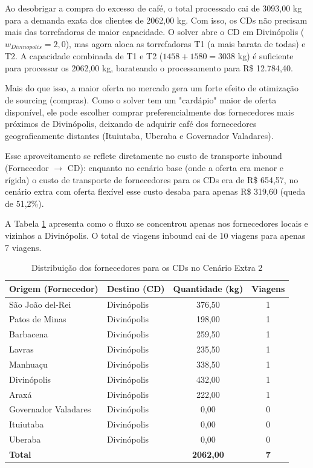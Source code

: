 \documentclass[a4paper,11pt]{article}
\begin{document}
Ao desobrigar a compra do excesso de café, o total processado cai de 3093,00 kg para a demanda exata dos clientes de 2062,00 kg. Com isso, os CDs não precisam mais das torrefadoras de maior capacidade. O solver abre o CD em Divinópolis ($w_{Divinopolis} = 2,0$), mas agora aloca as torrefadoras T1 (a mais barata de todas) e T2. A capacidade combinada de T1 e T2 ($1458 + 1580 = 3038$ kg) é suficiente para processar os 2062,00 kg, barateando o processamento para R\$ 12.784,40.

Mais do que isso, a maior oferta no mercado gera um forte efeito de otimização de sourcing (compras). Como o solver tem um "cardápio" maior de oferta disponível, ele pode escolher comprar preferencialmente dos fornecedores mais próximos de Divinópolis, deixando de adquirir café dos fornecedores geograficamente distantes (Ituiutaba, Uberaba e Governador Valadares).

Esse aproveitamento se reflete diretamente no custo de transporte inbound (Fornecedor $\rightarrow$ CD): enquanto no cenário base (onde a oferta era menor e rígida) o custo de transporte de fornecedores para os CDs era de R\$ 654,57, no cenário extra com oferta flexível esse custo desaba para apenas R\$ 319,60 (queda de 51,2\%).

A Tabela \ref{tab:cenario2_extra_forn_cd} apresenta como o fluxo se concentrou apenas nos fornecedores locais e vizinhos a Divinópolis. O total de viagens inbound cai de 10 viagens para apenas 7 viagens.

\begin{table}[H]
\centering
\begin{tabular}{llcc}
\hline
\textbf{Origem (Fornecedor)} & \textbf{Destino (CD)} & \textbf{Quantidade (kg)} & \textbf{Viagens} \\ \hline
São João del-Rei & Divinópolis & 376,50 & 1 \\
Patos de Minas & Divinópolis & 198,00 & 1 \\
Barbacena & Divinópolis & 259,50 & 1 \\
Lavras & Divinópolis & 235,50 & 1 \\
Manhuaçu & Divinópolis & 338,50 & 1 \\
Divinópolis & Divinópolis & 432,00 & 1 \\
Araxá & Divinópolis & 222,00 & 1 \\
Governador Valadares & Divinópolis & 0,00 & 0 \\
Ituiutaba & Divinópolis & 0,00 & 0 \\
Uberaba & Divinópolis & 0,00 & 0 \\ \hline
\textbf{Total} & & \textbf{2062,00} & \textbf{7} \\
\hline
\end{tabular}
\caption{Distribuição dos fornecedores para os CDs no Cenário Extra 2}
\label{tab:cenario2_extra_forn_cd}
\end{table}
\end{document}
